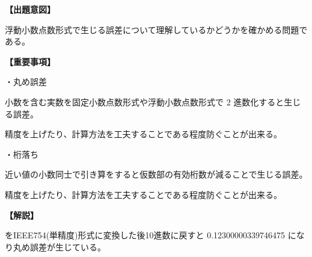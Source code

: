 \noindent \textbf{【出題意図】}

\noindent 浮動小数点数形式で生じる誤差について理解しているかどうかを確かめる問題である。

\vspace{1em}
\noindent \textbf{【重要事項】}

\medskip
\noindent ・丸め誤差

\medskip
\noindent 小数を含む実数を固定小数点数形式や浮動小数点数形式で 2 進数化すると生じる誤差。

\noindent 精度を上げたり、計算方法を工夫することである程度防ぐことが出来る。

\medskip
\noindent ・桁落ち

\medskip
\noindent 近い値の小数同士で引き算をすると仮数部の有効桁数が減ることで生じる誤差。

\noindent 精度を上げたり、計算方法を工夫することである程度防ぐことが出来る。


\vspace{1em}
\noindent \textbf{【解説】}

 をIEEE754(単精度)形式に変換した後10進数に戻すと 0.12300000339746475 になり丸め誤差が生じている。
